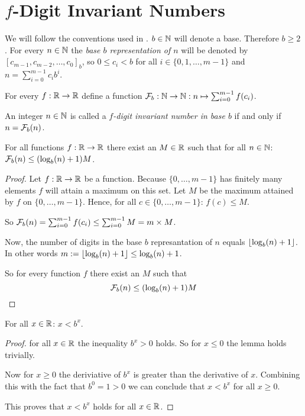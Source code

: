\section*{$f$-Digit Invariant Numbers}

We will follow the conventions used in \cite{dvb}. $b\in\mathbb{N}$ will denote a base.
Therefore $b \ge 2$. For every $n \in \mathbb{N}$ the \emph{base $b$ representation
of $n$} will be denoted by $[c_{m-1}, c_{m-2}, \ldots, c_{0}]_{b}$, so 
$0 \le c_{i} < b$ for all $i \in \{0,1,\ldots,m-1\}$ and 
$n = \sum_{i=0}^{m-1} c_{i}b^{i}$.

For every $f : \mathbb{R} \rightarrow \mathbb{R}$ define a function $\mathcal{F}_{b} : \mathbb{N} \rightarrow
\mathbb{N} : n \mapsto \sum_{i=0}^{m-1} f(c_{i})$.

\begin{definition}
	An integer $n \in \mathbb{N}$ is called a \emph{$f$-digit invariant number in base
	$b$} if and only if $n = \mathcal{F}_{b}(n)$.
\end{definition}

\begin{proposition}
	For all functions $f : \mathbb{R} \rightarrow \mathbb{R}$ there exist an 
	$M \in \mathbb{R}$ such that for all $n \in \mathbb{N}$: $\mathcal{F}_{b}(n) \le (\log_{b}(n) + 1) M$.
\end{proposition}

\begin{proof}
	Let $f : \mathbb{R} \rightarrow \mathbb{R}$ be a function. Because $\{0,\ldots,m-1\}$ has 
	finitely many elements $f$ will attain a maximum on this set. Let $M$ be the
	maximum	attained by $f$ on $\{0,\ldots,m-1\}$. Hence, for all 
	$c \in \{0,\ldots,m-1\}$: $f(c) \le M$.
	
	So $\mathcal{F}_{b}(n) = \sum_{i=0}^{m-1} f(c_{i}) \le 
	\sum_{i=0}^{m-1} M = m \times M$.
	
	Now, the number of digits in the base $b$ represantation of $n$ equals 
	$\lfloor\log_{b}(n) + 1\rfloor$. In other words $m := \lfloor\log_{b}(n) + 1\rfloor 
	\le \log_{b}(n) + 1$.
	
	So for every function $f$ there exist an $M$ such that
  \[
	  \mathcal{F}_{b}(n) \le (\log_{b}(n) + 1) M
  \]
\end{proof}

\begin{lemma}
	For all $x \in \mathbb{R}$: $x < b^{x}$.
\end{lemma}

\begin{proof}
	for all $x \in \mathbb{R}$ the inequality $b^{x} \gt 0$ holds. So for $x \le 0$ the
	lemma holds trivially.
	
	Now for $x \ge 0$ the deriviative of $b^{x}$ is greater than the derivative of
  $x$. Combining this with the fact that $b^{0} = 1 > 0$ we can conclude that $x
  \lt b^{x}$ for all $x \ge 0$. 
	
	This proves that $x < b^{x}$ holds for all $x \in \mathbb{R}$.
\end{proof}

